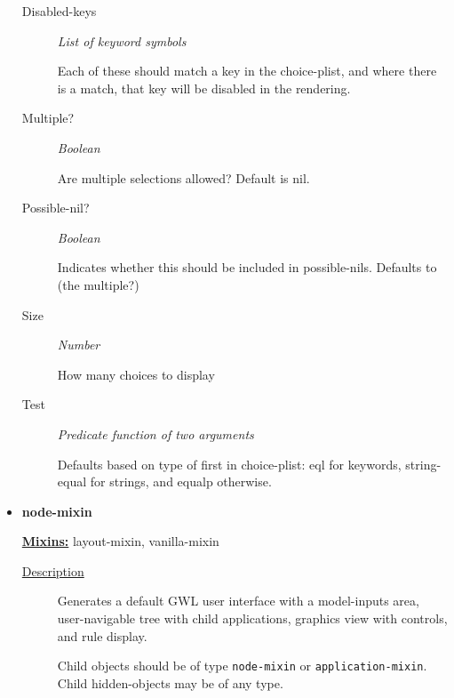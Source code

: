\documentclass [11pt]{book}
\begin{document}
\begin{itemize}
\begin{description}
\item [Disabled-keys]
\emph{List of keyword symbols}

 Each of these should match a key in the choice-plist, and where there is a
match, that key will be disabled in the rendering.




\item [Multiple?]
\emph{Boolean}

 Are multiple selections allowed? Default is nil.




\item [Possible-nil?]
\emph{Boolean}

 Indicates whether this should be included in possible-nils. Defaults to (the multiple?)




\item [Size]
\emph{Number}

 How many choices to display




\item [Test]
\emph{Predicate function of two arguments}

 Defaults based on type of first in choice-plist:
eql for keywords, string-equal for strings, and equalp otherwise.




\end{description}







\item {}
\label{prim:node-mixin}
\textbf{node-mixin}


\textbf{
\underline{Mixins:}} layout-mixin, vanilla-mixin





\begin{description}

\item [
\underline{Description}]


Generates a default GWL user interface with a model-inputs area,
user-navigable tree with child applications, graphics view with controls, and rule display. 

Child objects should be of type \texttt{node-mixin} or \texttt{application-mixin}. Child hidden-objects
may be of any type.


\end{description}
\end{itemize}
\end{document}
